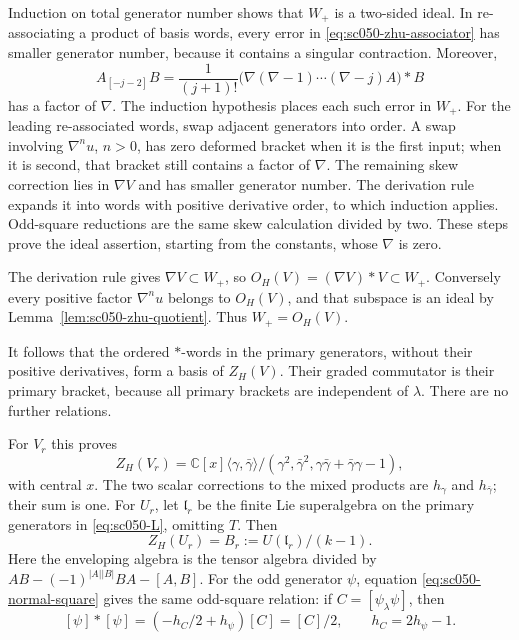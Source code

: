 Induction on total generator number shows that \(W_+\) is a
two-sided ideal. In re-associating a product of basis words, every
error in \eqref{eq:sc050-zhu-associator} has smaller generator
number, because it contains a singular contraction. Moreover,
\[
 A_{[-j-2]}B
   =\frac1{(j+1)!}
       \bigl(\nabla(\nabla-1)\cdots(\nabla-j)A\bigr)*B
\]
has a factor of \(\nabla\). The induction hypothesis places each
such error in \(W_+\). For the leading re-associated words, swap
adjacent generators into order. A swap involving \(\nabla^nu\),
\(n>0\), has zero deformed bracket when it is the first input;
when it is second, that bracket still contains a factor of
\(\nabla\). The remaining skew correction lies in \(\nabla V\)
and has smaller generator number. The derivation rule expands it
into words with positive derivative order, to which induction
applies. Odd-square reductions are the same skew calculation
divided by two. These steps prove the ideal assertion, starting
from the constants, whose \(\nabla\) is zero.

The derivation rule gives \(\nabla V\subset W_+\), so
\(O_H(V)=(\nabla V)*V\subset W_+\). Conversely every positive
factor \(\nabla^nu\) belongs to \(O_H(V)\), and that subspace is
an ideal by Lemma~\ref{lem:sc050-zhu-quotient}.
Thus \(W_+=O_H(V)\).

It follows that the ordered \(*\)-words in the primary generators,
without their positive derivatives, form a basis of \(Z_H(V)\).
Their graded commutator is their primary bracket, because all
primary brackets are independent of \(\lambda\).
There are no further relations.

For \(V_r\) this proves
\begin{equation}\label{eq:sc050-clifford}
 Z_H(V_r)=
 \mathbb C[x]\langle\gamma,\bar\gamma\rangle/
   (\gamma^2,\bar\gamma^2,\gamma\bar\gamma+\bar\gamma\gamma-1),
\end{equation}
with central \(x\). The two scalar corrections to the mixed
products are \(h_\gamma\) and \(h_{\bar\gamma}\); their sum is one.
For \(U_r\), let \(\mathfrak l_r\) be the finite Lie superalgebra
on the primary generators in \eqref{eq:sc050-L}, omitting \(T\).
Then
\begin{equation}\label{eq:sc050-B}
 Z_H(U_r)=B_r:=U(\mathfrak l_r)/(k-1).
\end{equation}
Here the enveloping algebra is the tensor algebra divided by
\(AB-(-1)^{|A||B|}BA-[A,B]\).
For the odd generator \(\psi\), equation
\eqref{eq:sc050-normal-square} gives the same odd-square relation:
if \(C=[\psi_\lambda\psi]\), then
\[
 [\psi]*[\psi]=(-h_C/2+h_\psi)[C]=[C]/2,
 \qquad h_C=2h_\psi-1.
\]


